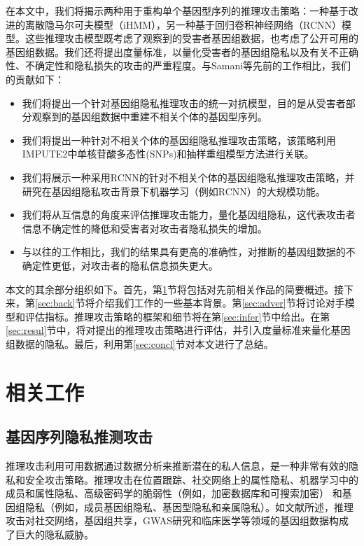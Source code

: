 在本文中，我们将揭示两种用于重构单个基因型序列的推理攻击策略：一种基于改进的离散隐马尔可夫模型（iHMM），另一种基于回归卷积神经网络（RCNN）模型。这些推理攻击模型既考虑了观察到的受害者基因组数据，也考虑了公开可用的基因组数据。我们还将提出度量标准，以量化受害者的基因组隐私以及有关不正确性、不确定性和隐私损失的攻击的严重程度。与Samani等先前的工作\cite{samani2015quantifying}相比，我们的贡献如下：
\begin{itemize}
	\item 我们将提出一个针对基因组隐私推理攻击的统一对抗模型，目的是从受害者部分观察到的基因组数据中重建不相关个体的基因型序列。
	\item 我们将提出一种针对不相关个体的基因组隐私推理攻击策略，该策略利用IMPUTE2\cite{howie2009flexible}中单核苷酸多态性(SNPs)和抽样重组模型方法进行关联。
	\item	我们将展示一种采用RCNN的针对不相关个体的基因组隐私推理攻击策略，并研究在基因组隐私攻击背景下机器学习（例如RCNN）的大规模功能。
	\item 我们将从互信息的角度来评估推理攻击能力，量化基因组隐私，这代表攻击者信息不确定性的降低和受害者对攻击者隐私损失的增加。
	\item 与以往的工作相比，我们的结果具有更高的准确性，对推断的基因组数据的不确定性更低，对攻击者的隐私信息损失更大。
\end{itemize}

本文的其余部分组织如下。首先，第\ref{sec:relat}节将包括对先前相关作品的简要概述。接下来，第\ref{sec:back}节将介绍我们工作的一些基本背景。第\ref{sec:adver}节将讨论对手模型和评估指标。推理攻击策略的框架和细节将在第\ref{sec:infer}节中给出。在第\ref{sec:resul}节中，将对提出的推理攻击策略进行评估，并引入度量标准来量化基因组数据的隐私。最后，利用第\ref{sec:concl}节对本文进行了总结。

\section{相关工作}\label{sec:relat}
\subsection{基因序列隐私推测攻击}

推理攻击利用可用数据通过数据分析来推断潜在的私人信息\cite{en2018inference}，是一种非常有效的隐私和安全攻击策略。推理攻击在位置跟踪\cite{narain2016inferring}、社交网络上的属性隐私\cite{gong2016you}、机器学习中的成员和属性隐私\cite{shokri2017membership,ganju2018property}、高级密码学的脆弱性（例如，加密数据库和可搜索加密）\cite{pouliot2016shadow} 和基因组隐私（例如，成员基因组隐私\cite{wang2009learning}、基因型隐私\cite{samani2015quantifying,he2017addressing}和亲属隐私\cite{humbert2013addressing}）。如文献\cite{ayday2017inference}所述，推理攻击对社交网络，基因组共享，GWAS研究和临床医学等领域的基因组数据构成了巨大的隐私威胁。

